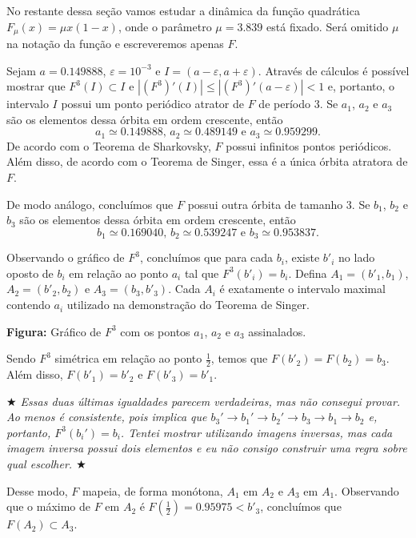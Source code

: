 No restante dessa seção vamos estudar a dinâmica da função quadrática $F_\mu(x) = \mu x(1-x)$, onde o parâmetro $\mu = 3.839$ está fixado. Será omitido $\mu$ na notação da função e escreveremos apenas $F$.

Sejam $a = 0.149888$, $\varepsilon = 10^{-3}$ e $I = (a - \varepsilon, a + \varepsilon)$. Através de cálculos é possível mostrar que $F^3(I) \subset I$ e $|(F^3)'(I)| \leq |(F^3)'(a - \varepsilon)| < 1$ e, portanto, o intervalo $I$ possui um ponto periódico atrator de $F$ de período $3$. Se $a_1$, $a_2$ e $a_3$ são os elementos dessa órbita em ordem crescente, então
$$a_1 \simeq 0.149888 \textrm{, } a_2 \simeq 0.489149 \textrm{ e } a_3 \simeq 0.959299.$$
De acordo com o Teorema de Sharkovsky, $F$ possui infinitos pontos periódicos. Além disso, de acordo com o Teorema de Singer, essa é a única órbita atratora de $F$.

De modo análogo, concluímos que $F$ possui outra órbita de tamanho $3$. Se $b_1$, $b_2$ e $b_3$ são os elementos dessa órbita em ordem crescente, então
$$b_1 \simeq 0.169040 \textrm{, } b_2 \simeq 0.539247  \textrm{ e } b_3 \simeq 0.953837.$$

Observando o gráfico de $F^3$, concluímos que para cada $b_i$, existe $b'_i$ no lado oposto de $b_i$ em relação ao ponto $a_i$ tal que $F^3(b'_i) = b_i$. Defina $A_1 = (b'_1, b_1)$, $A_2 = (b'_2, b_2)$ e $A_3 = (b_3, b'_3)$. Cada $A_i$ é exatamente o intervalo maximal contendo $a_i$ utilizado na demonstração do Teorema de Singer.

\begin{center}

{\small \textbf{Figura:} Gráfico de $F^3$ com os pontos $a_1$, $a_2$ e $a_3$ assinalados.}
\end{center}

Sendo $F^3$ simétrica em relação ao ponto $\frac{1}{2}$, temos que $F(b'_2) = F(b_2) = b_3$. Além disso, $F(b'_1) = b'_2$ e $F(b'_3) = b'_1$.

\textit{ $\bigstar$ Essas duas últimas igualdades parecem verdadeiras, mas não consegui provar. Ao menos é consistente, pois implica que $b_3' \to b_1' \to b_2' \to b_3 \to b_1 \to b_2$ e, portanto, $F^3(b_i') = b_i$. Tentei mostrar utilizando imagens inversas, mas cada imagem inversa possui dois elementos e eu não consigo construir uma regra sobre qual escolher. $\bigstar$}

Desse modo, $F$ mapeia, de forma monótona, $A_1$ em $A_2$ e $A_3$ em $A_1$. Observando que o máximo de $F$ em $A_2$ é $F \left( \frac{1}{2} \right) = 0.95975 < b'_3$, concluímos que $F(A_2) \subset A_3$.

